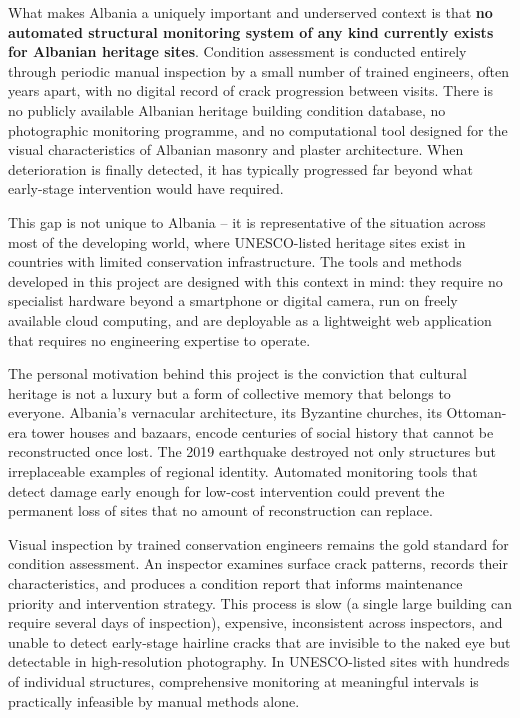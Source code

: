 \documentclass[12pt,a4paper]{article}
\begin{document}
What makes Albania a uniquely important and underserved context is that \textbf{no automated structural monitoring system of any kind currently exists for Albanian heritage sites}. Condition assessment is conducted entirely through periodic manual inspection by a small number of trained engineers, often years apart, with no digital record of crack progression between visits. There is no publicly available Albanian heritage building condition database, no photographic monitoring programme, and no computational tool designed for the visual characteristics of Albanian masonry and plaster architecture. When deterioration is finally detected, it has typically progressed far beyond what early-stage intervention would have required.

This gap is not unique to Albania -- it is representative of the situation across most of the developing world, where UNESCO-listed heritage sites exist in countries with limited conservation infrastructure. The tools and methods developed in this project are designed with this context in mind: they require no specialist hardware beyond a smartphone or digital camera, run on freely available cloud computing, and are deployable as a lightweight web application that requires no engineering expertise to operate.

The personal motivation behind this project is the conviction that cultural heritage is not a luxury but a form of collective memory that belongs to everyone. Albania's vernacular architecture, its Byzantine churches, its Ottoman-era tower houses and bazaars, encode centuries of social history that cannot be reconstructed once lost. The 2019 earthquake destroyed not only structures but irreplaceable examples of regional identity. Automated monitoring tools that detect damage early enough for low-cost intervention could prevent the permanent loss of sites that no amount of reconstruction can replace.

Visual inspection by trained conservation engineers remains the gold standard for condition assessment. An inspector examines surface crack patterns, records their characteristics, and produces a condition report that informs maintenance priority and intervention strategy. This process is slow (a single large building can require several days of inspection), expensive, inconsistent across inspectors, and unable to detect early-stage hairline cracks that are invisible to the naked eye but detectable in high-resolution photography. In UNESCO-listed sites with hundreds of individual structures, comprehensive monitoring at meaningful intervals is practically infeasible by manual methods alone.
\end{document}
